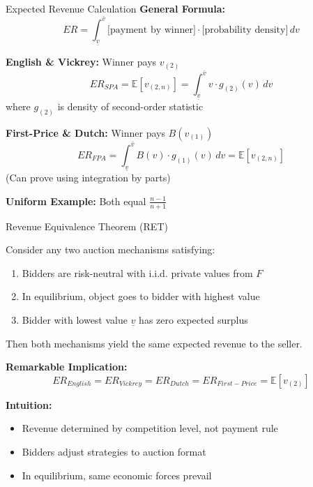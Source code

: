 \documentclass[xcolor={x11names}]{beamer}
\newcommand{\E}{\mathbb{E}}
\begin{document}
\begin{frame}{Expected Revenue Calculation}
\textbf{General Formula:}
$$ER = \int_{\underline{v}}^{\bar{v}} \text{[payment by winner]} \cdot \text{[probability density]} \, dv$$


\textbf{English \& Vickrey:} Winner pays $v_{(2)}$
$$ER_{SPA} = \E[v_{(2,n)}] = \int_{\underline{v}}^{\bar{v}} v \cdot g_{(2)}(v) \, dv$$
where $g_{(2)}$ is density of second-order statistic

\textbf{First-Price \& Dutch:} Winner pays $B(v_{(1)})$
$$ER_{FPA} = \int_{\underline{v}}^{\bar{v}} B(v) \cdot g_{(1)}(v) \, dv = \E[v_{(2,n)}]$$
(Can prove using integration by parts)

\textbf{Uniform Example:} Both equal $\frac{n-1}{n+1}$
\end{frame}

\begin{frame}{Revenue Equivalence Theorem (RET)}
\begin{theorem}
Consider any two auction mechanisms satisfying:
\begin{enumerate}
  \item Bidders are risk-neutral with i.i.d. private values from $F$
  \item In equilibrium, object goes to bidder with highest value
  \item Bidder with lowest value $\underline{v}$ has zero expected surplus
\end{enumerate}
Then both mechanisms yield the same expected revenue to the seller.
\end{theorem}

\textbf{Remarkable Implication:}
$$ER_{English} = ER_{Vickrey} = ER_{Dutch} = ER_{First-Price} = \E[v_{(2)}]$$

\textbf{Intuition:}
\begin{itemize}
  \item Revenue determined by competition level, not payment rule
  \item Bidders adjust strategies to auction format
  \item In equilibrium, same economic forces prevail
\end{itemize}
\end{frame}
\end{document}
